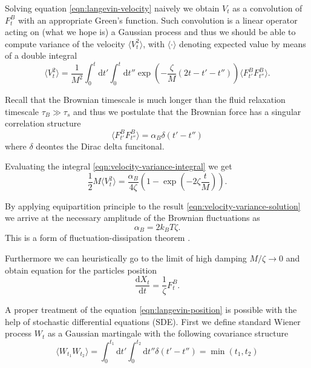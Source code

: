 \documentclass{doctoral}
\newcommand{\dd}{\mathrm{d}}
\begin{document}
Solving equation \eqref{eqn:langevin-velocity} naively we obtain $V_t$ as a convolution of $F_t^B$ with an appropriate Green's function.
Such convolution is a linear operator acting on (what we hope is) a Gaussian process and thus we should be able to compute variance of the velocity $\langle V_t^2 \rangle$, with $\langle \cdot \rangle$ denoting expected value by means of a double integral
\begin{equation}
    \langle V_t^2 \rangle = \frac{1}{M^2} \int_0^t \dd t' \int_0^t \dd t'' \exp\left( - \frac{\zeta}{M} (2t - t' - t'') \right) \langle F_{t'}^B F_{t''}^B \rangle.
    \label{eqn:velocity-variance-integral}
\end{equation}

Recall that the Brownian timescale is much longer than the fluid relaxation timescale $\tau_B \gg \tau_s$ and thus we postulate that the Brownian force has a singular correlation structure
\begin{equation}
    \langle F_{t'}^B F_{t''}^B \rangle = \alpha_B \delta(t'-t'') \label{eqn:white-noise-langevin}
\end{equation}
where $\delta$ deontes the Dirac delta funcitonal.

Evaluating the integral \eqref{eqn:velocity-variance-integral} we get
\begin{equation}
    \frac{1}{2} M \langle V_t^2 \rangle = \frac{\alpha_B}{4 \zeta} (1 - \exp(-2\zeta \frac{t}{M})).
    \label{eqn:velocity-variance-solution}
\end{equation}

By applying equipartition principle to the result \eqref{eqn:velocity-variance-solution} we arrive at the necessary amplitude of the Brownian fluctuations as
\begin{equation}
    \alpha_B = 2 k_B T \zeta.
    \label{eqn:fluctuation-dissipation-raighley-particle}
\end{equation}
This is a form of fluctuation-dissipation theorem \cite{van_Kampen_1984,Ottinger_2012}.

Furthermore we can heuristically go to the limit of high damping $M/\zeta \to 0$ and obtain equation for the particles position
\begin{equation}
    \frac{\dd X_t}{\dd t} = \frac{1}{\zeta} F_t^B.
    \label{eqn:langevin-position}
\end{equation}

A proper treatment of the equation \eqref{eqn:langevin-position} is possible with the help of stochastic differential equations (SDE).
First we define standard Wiener process $W_t$ as a Gaussian martingale with the following covariance structure
\begin{equation}
    \langle W_{t_1} W_{t_2} \rangle = \int_0^{t_1} \dd t' \int_0^{t_2} \dd t'' \delta(t' - t'') = \min(t_1, t_2) \label{eqn:wiener-process-definition}
\end{equation}
\end{document}
